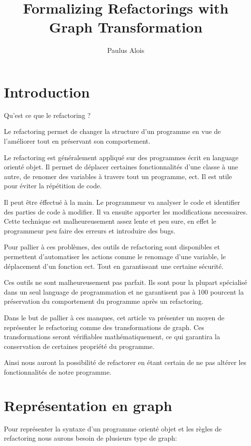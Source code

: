 \documentclass[a4paper, 12pt]{article}
\title{Formalizing Refactorings with Graph Transformation}
\author{Paulus Alois}
\begin{document}
\maketitle

\tableofcontents

\newpage

\section{Introduction}

Qu'est ce que le refactoring ? 

Le refactoring permet de changer la structure d'un programme en vue de l'améliorer
tout en préservant son comportement. 

Le refactoring est généralement appliqué sur des programmes écrit en language orienté objet. Il permet de déplacer certaines fonctionnalités d'une classe à une autre, de renomer des variables à travers tout un programme, ect. Il est utile pour éviter la répétition de code.

Il peut être éffectué à la main. Le programmeur va analyser le code et identifier des parties de code à modifier. Il va ensuite apporter les modifications necessaires.
Cette technique est malheureusement assez lente et peu sure, en effet le programmeur peu faire des erreurs et introduire des bugs.

Pour pallier à ces problèmes, des outils de refactoring sont disponibles et permettent d'automatiser les actions comme le renomage d'une variable, le déplacement d'un fonction ect. Tout en garantissant une certaine sécurité.

Ces outils ne sont malheureusement pas parfait. Ils sont pour la plupart spécialisé dans un seul language de programmation et ne garantisent pas à 100 pourcent la préservation du comportement du programme après un refactoring.

Dans le but de pallier à ces manques, cet article va présenter un moyen de représenter le refactoring comme des transformations de graph. Ces transformations seront vérifiables mathématiquement, ce qui garantira la conservation de certaines propriété du programme.

Ainsi nous auront la possibilité de refactorer en étant certain de ne pas altérer les fonctionnalités de notre programme.

\newpage 

\section{Représentation en graph}
Pour représenter la syntaxe d'un programme orienté objet et les règles de refactoring nous aurons besoin de plusieurs type de graph:
\end{document}
